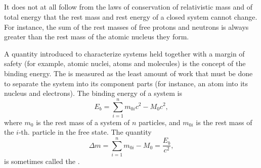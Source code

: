 \subsection{}\label{5.7.6} It does not at all follow from the laws of conservation of relativistic mass  and of total energy  that the rest mass and rest energy of a closed system cannot change. For instance, the sum of the rest masses of free protons and neutrons is always greater than the rest mass of the atomic nucleus they form.

A quantity introduced to characterize systems held together with a margin of safety (for example, atomic nuclei, atoms and molecules) is the concept of the binding energy. The  is measured as the least amount of work that must be done to separate the system into its component parts (for instance, an atom into its nucleus and electrons). The binding energy of a system is
\begin{equation*}%
E_{b} = \sum_{i=1}^{n} m_{0i}c^{2} - M_{0}c^{2},
\end{equation*}
where $m_{0}$ is the rest mass of a system of $n$ particles, and $m_{0i}$ is the rest mass of the $i$-th. particle in the free state. The quantity
\begin{equation*}%
\Delta m = \sum_{i=1}^{n} m_{0i} - M_{0} = \frac{E_{b}}{c^{2}},
\end{equation*}
is sometimes called the .





